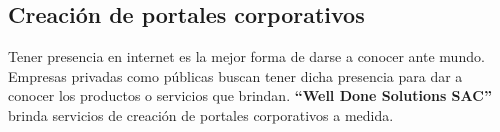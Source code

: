 		\subsection{Creación de portales corporativos}
			Tener presencia en internet es la mejor forma de darse a conocer ante mundo.
			Empresas privadas como públicas buscan tener dicha presencia para dar a
			conocer los productos o servicios que brindan.
			{\bf ``Well Done Solutions SAC''} brinda servicios de creación de portales
			corporativos a medida.

